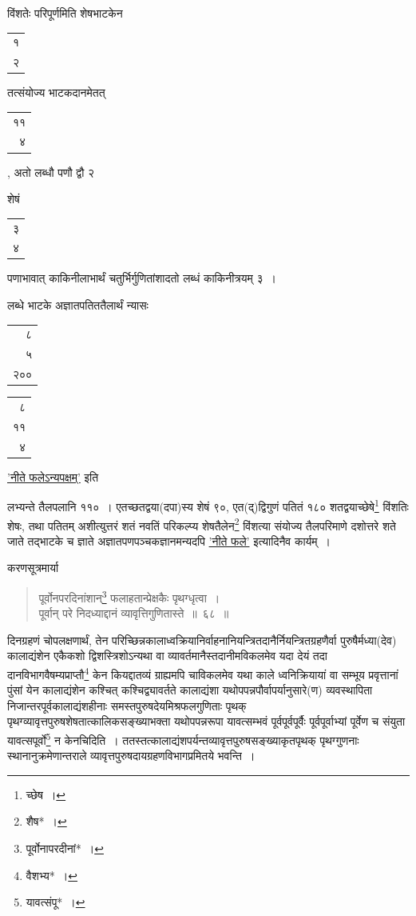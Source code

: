 \documentclass[10pt, openany]{book}
\begin{document}
{{{{{विंशतेः परिपूर्णमिति शेषभाटकेन\begin{tabular}{r}१\\ २\end{tabular}तत्संयोज्य भाटकदानमेतत्\begin{tabular}{r}११\\ ४\end{tabular}, अतो
लब्धौ पणौ द्वौ २}
{शेषं\begin{tabular}{r}३\\ ४\end{tabular}पणाभावात् काकिनीलाभार्थं चतुर्भिर्गुणितांशादतो लब्धं
काकिनीत्रयम् ३~।}
\vspace{2mm}

{लब्धे भाटके अज्ञातपतिततैलार्थं न्यासः\begin{tabular}{r|}८\\ ५\\२०० \end{tabular}\begin{tabular}{r}८\\  ११ \\ ४ \end{tabular}}\hyperref[45]{'नीते फलेऽन्यपक्षम्'} इति}
{लभ्यन्ते तैलपलानि ११०~। एतच्छतद्वया(दपा)स्य शेषं ९०, एत(द्)द्विगुणं
पतितं १८०}
{शतद्वयाच्छेषे\renewcommand{\thefootnote}{\s ६}\footnote{\s च्छेष~।}  विंशतिः शेषः, तथा पतितम् अशीत्युत्तरं शतं नवतिं
परिकल्प्य शेषतैलेन\renewcommand{\thefootnote}{\s ७}\footnote{\s शैष*~।}  विंशत्या}
{संयोज्य तैलपरिमाणे दशोत्तरे शते जाते तद्भाटके च ज्ञाते
अज्ञातपणपञ्चकज्ञानमन्यदपि}
{\hyperref[45]{'नीते फले'} इत्यादिनैव कार्यम्~।}
\vspace{3mm}

{करणसूत्रमार्या\textemdash}

 \label{68}
\begin{quote}
    
{\bs पूर्वोनपरदिनांशान्\renewcommand{\thefootnote}{\s ८}\footnote{\s पूर्वोनापरदीनां*~।}  फलाहतान्प्रेक्षकैः पृथग्धृत्वा~। \\
 पूर्वान् परे निदध्याद्दानं व्यावृत्तिगुणितास्ते~॥~६८~॥}\end{quote}

\newpage

{दिनग्रहणं चोपलक्षणार्थं, तेन
परिच्छिन्नकालाध्वक्रियानिर्वाहनानियन्त्रितदानैर्नियन्त्रितग्रहणैर्वा पुरुषैर्मध्या(देव) कालाद्यंशेन एकैकशो द्विशस्त्रिशोऽन्यथा वा
व्यावर्तमानैस्तदानीमविकलमेव यदा देयं तदा दानविभागवैषम्यप्राप्तौ\renewcommand{\thefootnote}{\s १}\footnote{\s *वैशभ्य*~।} केन कियद्दातव्यं
ग्राह्यमपि चाविकलमेव यथा}
{काले ध्वनिक्रियायां वा सम्भूय प्रवृत्तानां पुंसां येन कालाद्यंशेन
कश्चित् कश्चिद्व्यावर्तते कालाद्यंशा}
{यथोपपन्नपौर्वापर्यानुसारे(ण) व्यवस्थापिता निजान्तरपूर्वकालाद्यंशहीनाः
समस्तपुरुषदेयमिश्रफलगुणिताः पृथक् पृथग्व्यावृत्तपुरुषशेषतात्कालिकसङ्ख्याभक्ता यथोपपन्नरूपा
यावत्सम्भवं पूर्वपूर्वपूर्वैः पूर्वपूर्वाभ्यां पूर्वेण च संयुता यावत्सपूर्वो\renewcommand{\thefootnote}{\s २}\footnote{\s यावत्संपू*~।} न केनचिदिति~। ततस्तत्कालाद्यंशपर्यन्तव्यावृत्तपुरुषसङ्ख्याकृतपृथक् पृथग्गुणनाः स्थानानुक्रमेणान्तराले
व्यावृत्तपुरुषदायग्रहणविभागप्रमितये भवन्ति~।}
\vspace{3mm}

}}}
\end{document}
